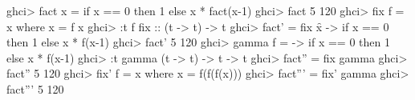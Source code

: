 
\begin{haskellcode}
ghci> fact x = if x == 0 then 1 else x * fact(x-1)
ghci> fact 5
120
ghci> fix f = x where x = f x
ghci> :t f
fix :: (t -> t) -> t
ghci> fact' = fix \f x -> if x == 0 then 1 else x * f(x-1)
ghci> fact' 5
120
ghci> gamma f = \x -> if x == 0 then 1 else x * f(x-1)
ghci> :t gamma
(t -> t) -> t -> t
ghci> fact'' = fix gamma
ghci> fact'' 5
120
ghci> fix' f = x where x = f(f(f(x)))
ghci> fact''' = fix' gamma
ghci> fact''' 5
120
\end{haskellcode}


